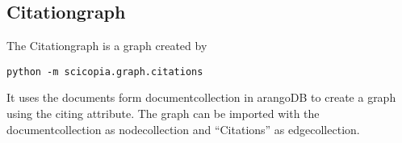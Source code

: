 \subsection{Citationgraph}
The Citationgraph is a graph created by 
\begin{verbatim}
python -m scicopia.graph.citations
\end{verbatim}
It uses the documents form documentcollection in arangoDB to create a graph using the citing %
attribute. The graph can be imported with the documentcollection as nodecollection and ``Citations'' as edgecollection.
